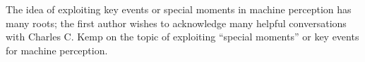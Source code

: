 
The idea of exploiting key events or special moments in machine
perception has many roots; 
%
the first author wishes to acknowledge many helpful conversations with
Charles C. Kemp on the topic of exploiting ``special moments'' or key
events for machine perception.
